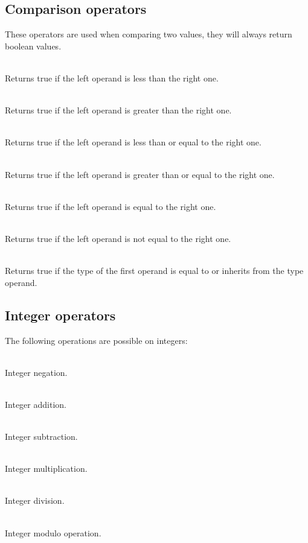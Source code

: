 \subsection{Comparison operators}

These operators are used when comparing two values, they will always return
boolean values.
\begin{dlist}
  \item {}\\
    Returns true if the left operand is less than the right one.
  \item {}\\
    Returns true if the left operand is greater than the right one.
  \item {}\\
    Returns true if the left operand is less than or equal to the right one.
  \item {}\\
    Returns true if the left operand is greater than or equal to the right one.
  \item {}\\
    Returns true if the left operand is equal to the right one.
  \item {}\\
    Returns true if the left operand is not equal to the right one.
  \item {}\\
    Returns true if the type of the first operand is equal to or inherits from
    the type operand.
\end{dlist}

\subsection{Integer operators}

The following operations are possible on integers:
\begin{dlist}
  \item {} \\
    Integer negation.
  \item {} \\
    Integer addition.
  \item {} \\
    Integer subtraction.
  \item {} \\
    Integer multiplication.
  \item {} \\
    Integer division.
  \item {} \\
    Integer modulo operation.
\end{dlist}


